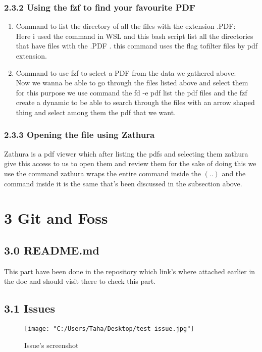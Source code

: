 \documentclass{article}
\begin{document}
\subsubsection*{\large 2.3.2 Using the fzf to find your favourite PDF}
\begin{enumerate}
    \item Command to list the directory of all the files with the extension .PDF:\\
    Here i used the command  in WSL and this bash script list all the directories
    that have files with the .PDF . this command uses the  flag tofilter files by pdf extension.
    \item Command to use fzf to select a PDF from the data we gathered above:\\
    Now we wanna be able to go through the files listed above and select them for this purpose we use 
     command the fd -e pdf list the pdf files and the fzf create a dynamic to be able to search through the files 
    with an arrow shaped thing and select among them the pdf that we want.
\end{enumerate}

\subsubsection*{\large 2.3.3 Opening the file using Zathura}
Zathura is a pdf viewer which after listing the pdfs and selecting them zathura give this access to us to open them and review them
for the sake of doing this we use the command  zathura wraps the entire command inside the $(..)$ and the command inside it is the same that's been discussed in the subsection above.



\section*{\Huge 3 Git and Foss}
\subsection*{\Large 3.0 README.md}
This part have been done in the repository which link's where attached earlier in the doc and should visit there to check this part.
\subsection*{\Large 3.1 Issues}
\begin{figure}[h]
    \centering
    \texttt{[image: "C:/Users/Taha/Desktop/test issue.jpg"]}
    \caption{Issue's screenshot}
    \label{fig:enter-label}
\end{figure}
\end{document}
